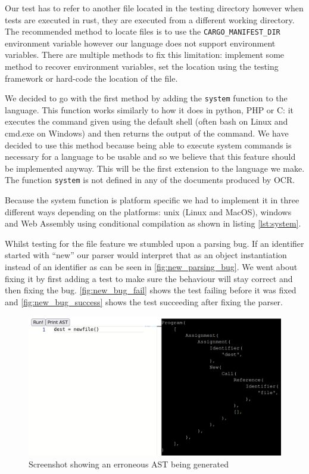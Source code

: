 \documentclass{article}
\begin{document}
Our test has to refer to another file located in the testing directory however
when tests are executed in rust, they are executed from a different working
directory. The recommended method to locate files is to use the
\texttt{CARGO\_MANIFEST\_DIR} environment variable however our language does
not support environment variables. There are multiple methods to fix this
limitation: implement some method to recover environment variables, set the
location using the testing framework or hard-code the location of the file.

We decided to go with the first method by adding the \texttt{system} function
to the language. This function works similarly to how it does in python, PHP or
C: it executes the command given using the default shell (often bash on Linux
and cmd.exe on Windows) and then returns the output of the command. We have
decided to use this method because being able to execute system commands is
necessary for a language to be usable and so we believe that this feature
should be implemented anyway. This will be the first extension to the language
we make. The function \texttt{system} is not defined in any of the documents
produced by OCR.

Because the system function is platform specific we had to implement it in
three different ways depending on the platforms: unix (Linux and MacOS),
windows and Web Assembly using conditional compilation as shown in listing
\ref{lst:system}.

Whilst testing for the file feature we stumbled upon a parsing bug. If an
identifier started with ``new'' our parser would interpret that as an object
instantiation instead of an identifier as can be seen in
\autoref{fig:new_parsing_bug}. We went about fixing it by first adding a test
to make sure the behaviour will stay correct and then fixing the bug.
\autoref{fig:new_bug_fail} shows the test failing before it was fixed and
\autoref{fig:new_bug_success} shows the test succeeding after fixing the
parser.

\begin{figure}
	\includegraphics[width=\textwidth]{new_parsing_bug}
	\caption{Screenshot showing an erroneous AST being generated}
	\label{fig:new_parsing_bug}
\end{figure}
\end{document}
